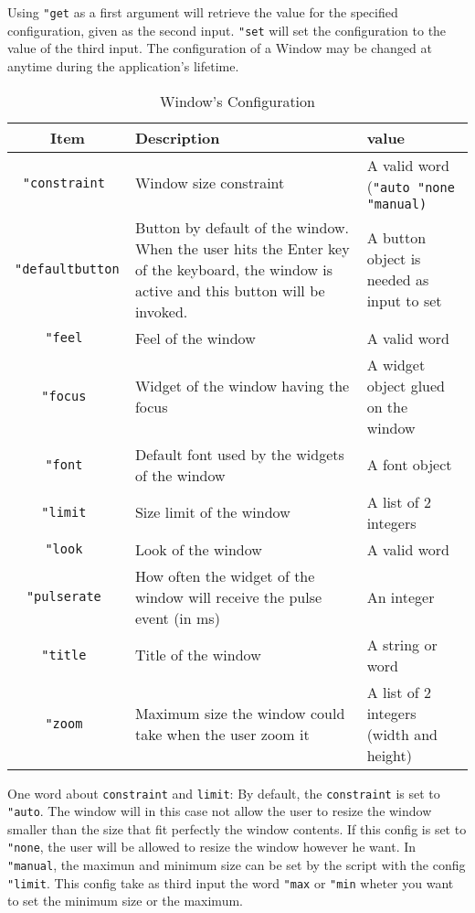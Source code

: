 Using {\tt "get} as a first argument will retrieve the value for the specified configuration, given as the second input. {\tt "set} will set the configuration to the  value of the third input. The configuration of a Window may be changed at anytime during the application's lifetime.\\

\begin{table}[h!]
\centering
\begin{tabular}{|c|p{7cm}|p{3.5cm}|}
\hline
\bf Item & \bf Description & \bf value \\
\hline
\tt "constraint & Window size constraint & A valid word (\tt "auto "none "manual)\\
\hline
\tt "defaultbutton & Button by default of the window. When the user hits the Enter key of the keyboard, the window is active and this button will be invoked. & A button object is needed as input to set\\
\hline
\tt "feel & Feel of the window & A valid word \\
\hline
\tt "focus & Widget of the window having the focus & A widget object glued on the window \\
\hline
\tt "font & Default font used by the widgets of the window & A font object \\
\hline
\tt "limit & Size limit of the window & A list of 2 integers\\
\hline
\tt "look & Look of the window & A valid word \\
\hline
\tt "pulserate & How often the widget of the window will receive the pulse event (in ms) & An integer \\
\hline
\tt "title & Title of the window & A string or word \\
\hline
\tt "zoom & Maximum size the window could take when the user zoom it & A list of 2 integers (width and height)\\
\hline
\end{tabular}
\caption{Window's Configuration}
\end{table}

One word about {\tt constraint} and {\tt limit}: By default, the {\tt constraint} is set to {\tt "auto}. The window will in this case not allow the
user to resize the window smaller than the size that fit perfectly the window contents. If this config is set to {\tt "none}, the user will be allowed to resize the window however he want. In {\tt "manual}, the maximun and minimum
size can be set by the script with the config {\tt "limit}. This config take as 
third input the word {\tt "max} or {\tt "min} wheter you want to set the minimum size or the maximum. 

